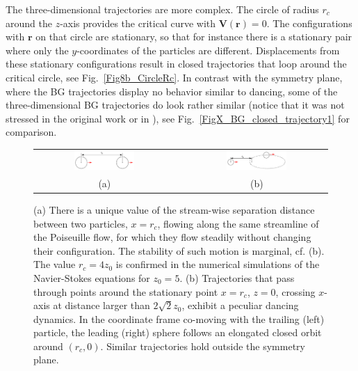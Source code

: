 The three-dimensional trajectories are more complex. The circle of radius $r_c$ around the $z$-axis provides the critical curve with $\bm V(\bm r)=0$. The configurations with $\bm r$ on that circle are stationary, so that for instance there is a stationary pair where only the $y$-coordinates of the particles are different. Displacements from these stationary configurations result in closed trajectories that loop around the critical circle, see Fig.~\ref{Fig8b_CircleRc}. In contrast with the symmetry plane, where the BG trajectories display no behavior similar to dancing, some of the three-dimensional BG trajectories do look rather similar (notice that it was not stressed in the original work or in \cite{arp}), see Fig.~\ref{FigX_BG_closed_trajectory1} for comparison.
%
\begin{figure}[t]
 \centering
\begin{tabular}{ccc}
\includegraphics[width=0.45\textwidth]{Draw1.pdf} &
\hskip1cm&
\includegraphics[width=0.45\textwidth]{Draw2.pdf} \\
(a) && (b)
\end{tabular}
\caption{(a) There is a unique value of the stream-wise separation distance between two particles, $x=r_c$, flowing along the same streamline of the Poiseuille flow, for which they flow steadily without changing their configuration. The stability of such motion is marginal, cf. (b). The value $r_c=4 z_0$ is confirmed in the numerical simulations of the Navier-Stokes equations for $z_0=5$.
(b) Trajectories that pass through points around the stationary point $x=r_c$, $z=0$, crossing $x$-axis at distance larger than $2\sqrt{2}z_0$, exhibit a peculiar dancing dynamics. In the coordinate frame co-moving with the trailing (left) particle, the leading (right) sphere follows an elongated closed orbit around $(r_c, 0)$. Similar trajectories hold outside the symmetry plane.}
\label{Draw1}
\end{figure}

